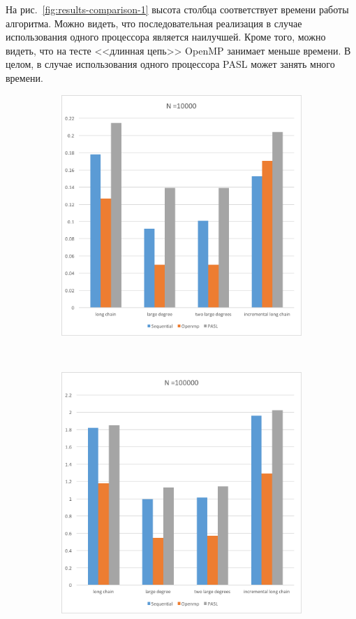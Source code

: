 \documentclass[specification,annotation]{itmo-student-thesis}
\begin{document}
На рис.~\ref{fig:results-comparison-1} высота столбца соответствует времени работы алгоритма. Можно видеть, что последовательная реализация в случае использования одного процессора является наилучшей. 
Кроме того, можно видеть, что на тесте <<длинная цепь>> OpenMP занимает меньше времени. В целом, в случае использования одного процессора PASL может занять много времени.

\begin{figure}[!ht]
\centering
\begin{subfigure}[b]{0.45\textwidth}
    \includegraphics[width=\textwidth]{pic/results-2-a.png}
\end{subfigure}~~\begin{subfigure}[b]{0.45\textwidth}
    \includegraphics[width=\textwidth]{pic/results-2-b.png}

\end{subfigure}
\end{figure}
\end{document}
